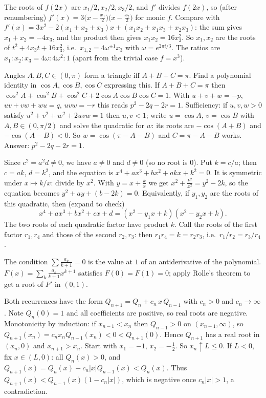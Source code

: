 \documentclass[11pt,a4paper]{article}
\begin{document}

 The roots of $f(2x)$ are $x_1/2,x_2/2,x_3/2$, and $f'$ divides $f(2x)$, so (after renumbering) $f'(x)=3\bigl(x-\frac{x_1}2\bigr)\bigl(x-\frac{x_2}2\bigr)$ for monic $f$.
 Compare with $f'(x)=3x^2-2(x_1+x_2+x_3)x+(x_1x_2+x_1x_3+x_2x_3)$: the sum gives $x_1+x_2=-4x_3$, and the product then gives $x_1x_2=16x_3^2$.
 So $x_1,x_2$ are the roots of $t^2+4x_3t+16x_3^2$, i.e.\ $x_{1,2}=4\omega^{\pm1}x_3$ with $\omega=e^{2\pi i/3}$. The ratios are $x_1:x_2:x_3=4\omega:4\omega^2:1$ (apart from the trivial case $f=x^3$).

 Angles $A,B,C\in(0,\pi)$ form a triangle iff $A+B+C=\pi$. Find a polynomial identity in $\cos A,\cos B,\cos C$ expressing this.
 If $A+B+C=\pi$ then $\cos^2A+\cos^2B+\cos^2C+2\cos A\cos B\cos C=1$. With $u+v+w=-p$, $uv+vw+wu=q$, $uvw=-r$ this reads $p^2-2q-2r=1$.
 Sufficiency: if $u,v,w>0$ satisfy $u^2+v^2+w^2+2uvw=1$ then $u,v<1$; write $u=\cos A$, $v=\cos B$ with $A,B\in(0,\pi/2)$ and solve the quadratic for $w$: its roots are $-\cos(A+B)$ and $-\cos(A-B)<0$. So $w=\cos(\pi-A-B)$ and $C=\pi-A-B$ works. Answer: $p^2-2q-2r=1$.

 Since $c^2=a^2d\ne0$, we have $a\ne0$ and $d\ne0$ (so no root is $0$). Put $k=c/a$; then $c=ak$, $d=k^2$, and the equation is $x^4+ax^3+bx^2+akx+k^2=0$. It is symmetric under $x\mapsto k/x$: divide by $x^2$.
 With $y=x+\frac kx$ we get $x^2+\frac{k^2}{x^2}=y^2-2k$, so the equation becomes $y^2+ay+(b-2k)=0$. Equivalently, if $y_1,y_2$ are the roots of this quadratic, then (expand to check)
\[x^4+ax^3+bx^2+cx+d=(x^2-y_1x+k)(x^2-y_2x+k).\]
 The two roots of each quadratic factor have product $k$. Call the roots of the first factor $r_1,r_4$ and those of the second $r_2,r_3$: then $r_1r_4=k=r_2r_3$, i.e.\ $r_1/r_2=r_3/r_4$.

 The condition $\sum\frac{a_k}{k+1}=0$ is the value at $1$ of an antiderivative of the polynomial.
 $F(x)=\sum_k\frac{a_k}{k+1}x^{k+1}$ satisfies $F(0)=F(1)=0$; apply Rolle's theorem to get a root of $F'$ in $(0,1)$.

 Both recurrences have the form $Q_{n+1}=Q_n+c_n\,x\,Q_{n-1}$ with $c_n>0$ and $c_n\to\infty$. Note $Q_n(0)=1$ and all coefficients are positive, so real roots are negative.
 Monotonicity by induction: if $x_{n-1}<x_n$ then $Q_{n-1}>0$ on $(x_{n-1},\infty)$, so $Q_{n+1}(x_n)=c_nx_nQ_{n-1}(x_n)<0<Q_{n+1}(0)$. Hence $Q_{n+1}$ has a real root in $(x_n,0)$ and $x_{n+1}>x_n$. Start with $x_1=-1$, $x_2=-\frac12$.
 So $x_n\uparrow L\le0$. If $L<0$, fix $x\in(L,0)$: all $Q_n(x)>0$, and $Q_{n+1}(x)=Q_n(x)-c_n|x|Q_{n-1}(x)<Q_n(x)$. Thus $Q_{n+1}(x)<Q_{n-1}(x)(1-c_n|x|)$, which is negative once $c_n|x|>1$, a contradiction.
\end{document}
